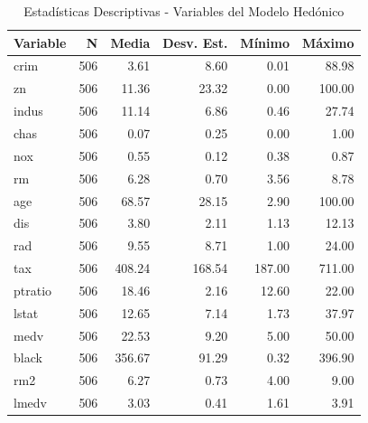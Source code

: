\documentclass[12pt]{article}
\begin{document}
\begin{table}

\caption{Estadísticas Descriptivas - Variables del Modelo Hedónico}
\centering
\begin{tabular}[t]{lrrrrr}
\toprule
Variable & N & Media & Desv. Est. & Mínimo & Máximo\\
\midrule
crim & 506 & 3.61 & 8.60 & 0.01 & 88.98\\
zn & 506 & 11.36 & 23.32 & 0.00 & 100.00\\
indus & 506 & 11.14 & 6.86 & 0.46 & 27.74\\
chas & 506 & 0.07 & 0.25 & 0.00 & 1.00\\
nox & 506 & 0.55 & 0.12 & 0.38 & 0.87\\
\addlinespace
rm & 506 & 6.28 & 0.70 & 3.56 & 8.78\\
age & 506 & 68.57 & 28.15 & 2.90 & 100.00\\
dis & 506 & 3.80 & 2.11 & 1.13 & 12.13\\
rad & 506 & 9.55 & 8.71 & 1.00 & 24.00\\
tax & 506 & 408.24 & 168.54 & 187.00 & 711.00\\
\addlinespace
ptratio & 506 & 18.46 & 2.16 & 12.60 & 22.00\\
lstat & 506 & 12.65 & 7.14 & 1.73 & 37.97\\
medv & 506 & 22.53 & 9.20 & 5.00 & 50.00\\
black & 506 & 356.67 & 91.29 & 0.32 & 396.90\\
rm2 & 506 & 6.27 & 0.73 & 4.00 & 9.00\\
\addlinespace
lmedv & 506 & 3.03 & 0.41 & 1.61 & 3.91\\
\bottomrule
\end{tabular}
\end{table}
\end{document}
